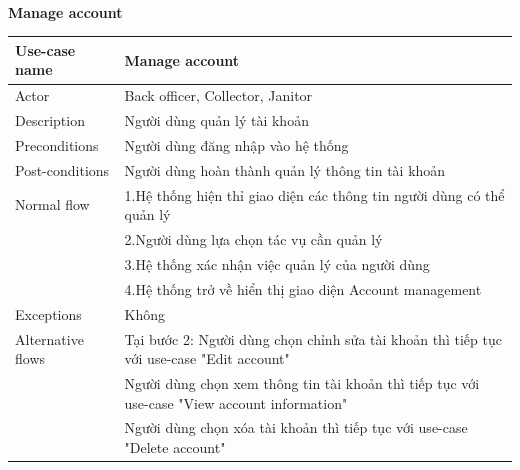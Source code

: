 \documentclass[a4paper]{article}
\begin{document}
\begin{enumerate}
\begin{tabular}{| p{3cm} | p{10cm} |}
\end{tabular}\\ \\
\vspace{0.5cm} \\
\textbf{Manage account}\\
\begin{tabular}{| p{3cm} | p{10cm} |}
  \hline
     Use-case name & Manage account
     \\
     \hline
     Actor & Back officer, Collector, Janitor
     \\ \hline
     Description & Người dùng quản lý tài khoản
      \\
     \hline
     Preconditions & Người dùng đăng nhập vào hệ thống
     \\ \hline
     Post-conditions & Người dùng hoàn thành quản lý thông tin tài khoản
     \\ \hline
      Normal flow & 1.Hệ thống hiện thỉ giao diện các thông tin người dùng có thể quản lý\\
& 2.Người dùng lựa chọn tác vụ cần quản lý\\
& 3.Hệ thống xác nhận việc quản lý của người dùng\\
& 4.Hệ thống trở về hiển thị giao diện Account management\\
\hline
     Exceptions & Không
     \\ \hline
     Alternative flows & Tại bước 2: Người dùng chọn chỉnh sửa tài khoản thì tiếp tục với use-case "Edit account" \\
     & Người dùng chọn xem thông tin tài khoản thì tiếp tục với use-case "View account information" \\
     & Người dùng chọn xóa tài khoản thì tiếp tục với use-case "Delete account"
     \\ \hline
     

\end{tabular}
\end{enumerate}
\end{document}

